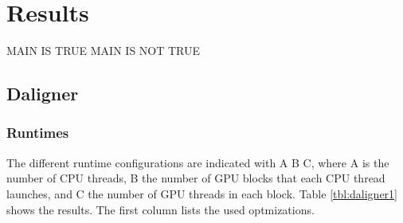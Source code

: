 \documentclass[../main/thesis.tex]{subfiles}
\begin{document}
\chapter{Results}
\ifdefined\main
\acresetall
MAIN IS TRUE
\newcommand{\codePath}{../5_results/code/}
\newcommand{\figPath}{../5_results/figures/}
\else
MAIN IS NOT TRUE

\fi


\section{Daligner}
\subsection{Runtimes}
The different runtime configurations are indicated with A B C, where A is the number of CPU threads, B the number of GPU blocks that each CPU thread launches, and C the number of GPU threads in each block.
Table \ref{tbl:daligner1} shows the results.
The first column lists the used optmizations.
\end{document}
